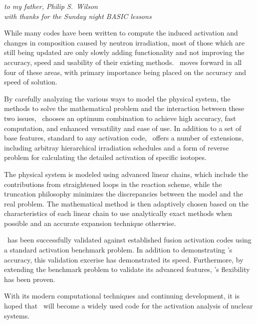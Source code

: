 
\maketitle

\newpage
\thispagestyle{empty}


\begin{center}
  \textsl{to my father, Philip S.~Wilson\\
with thanks for the Sunday night BASIC lessons}
\end{center}


\newpage

\begin{myabstract}
  
  While many codes have been written to compute the induced activation
  and changes in composition caused by neutron irradiation, most of
  those which are still being updated are only slowly adding
  functionality and not improving the accuracy, speed and usability of
  their existing methods.  \ALARA\ moves forward in all four of these
  areas, with primary importance being placed on the accuracy and
  speed of solution.
  
  By carefully analyzing the various ways to model the physical
  system, the methods to solve the mathematical problem and the
  interaction between these two issues, \ALARA\ chooses an optimum
  combination to achieve high accuracy, fast computation, and enhanced
  versatility and ease of use.  In addition to a set of base features,
  standard to any activation code, \ALARA\ offers a number of
  extensions, including arbitray hierarchical irradiation schedules
  and a form of reverse problem for calculating the detailed
  activation of specific isotopes.
  
  The physical system is modeled using advanced linear chains, which
  include the contributions from straightened loops in the reaction
  scheme, while the truncation philosophy minimizes the discrepancies
  between the model and the real problem.  The mathematical method is
  then adaptively chosen based on the characteristics of each linear
  chain to use analytically exact methods when possible and an
  accurate expansion technique otherwise.
  
  \ALARA\ has been successfully validated against established fusion
  activation codes using a standard activation benchmark problem.  In
  addition to demonstrating \ALARA's accuracy, this validation
  excerise has demonstrated its speed.  Furthermore, by extending the
  benchmark problem to validate its advanced features, \ALARA's
  flexibility has been proven.
  
  With its modern computational techniques and continuing development,
  it is hoped that \ALARA\ will become a widely used code for the
  activation analysis of nuclear systems.

\end{myabstract}

\tableofcontents

\listoffigures

\listoftables









